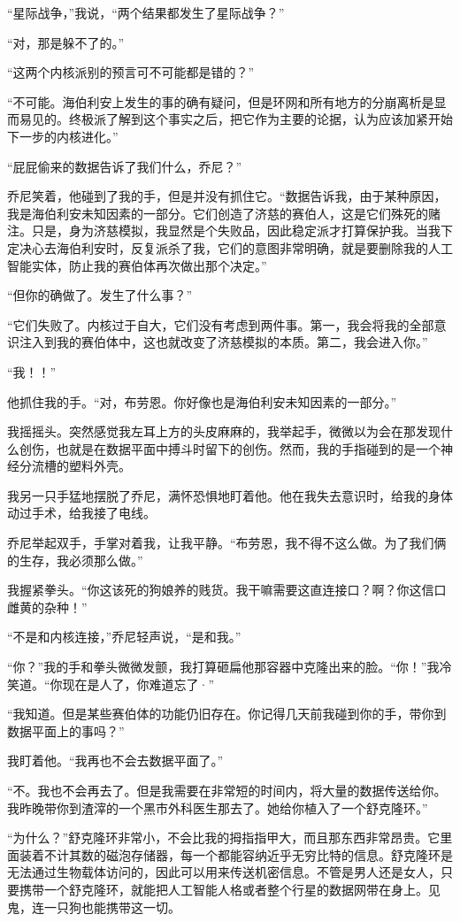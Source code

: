 \documentclass[AutoFakeBold=true]{book}
\begin{document}
``星际战争，''我说，``两个结果都发生了星际战争？''

``对，那是躲不了的。''

``这两个内核派别的预言可不可能都是错的？''

``不可能。海伯利安上发生的事的确有疑问，但是环网和所有地方的分崩离析是显而易见的。终极派了解到这个事实之后，把它作为主要的论据，认为应该加紧开始下一步的内核进化。''

``屁屁偷来的数据告诉了我们什么，乔尼？''

乔尼笑着，他碰到了我的手，但是并没有抓住它。``数据告诉我，由于某种原因，我是海伯利安未知因素的一部分。它们创造了济慈的赛伯人，这是它们殊死的赌注。只是，身为济慈模拟，我显然是个失败品，因此稳定派才打算保护我。当我下定决心去海伯利安时，反复派杀了我，它们的意图非常明确，就是要删除我的人工智能实体，防止我的赛伯体再次做出那个决定。''

``但你的确做了。发生了什么事？''

``它们失败了。内核过于自大，它们没有考虑到两件事。第一，我会将我的全部意识注入到我的赛伯体中，这也就改变了济慈模拟的本质。第二，我会进入你。''

``我！！''

他抓住我的手。``对，布劳恩。你好像也是海伯利安未知因素的一部分。''

我摇摇头。突然感觉我左耳上方的头皮麻麻的，我举起手，微微以为会在那发现什么创伤，也就是在数据平面中搏斗时留下的创伤。然而，我的手指碰到的是一个神经分流槽的塑料外壳。

我另一只手猛地摆脱了乔尼，满怀恐惧地盯着他。他在我失去意识时，给我的身体动过手术，给我接了电线。

乔尼举起双手，手掌对着我，让我平静。``布劳恩，我不得不这么做。为了我们俩的生存，我必须那么做。''

我握紧拳头。``你这该死的狗娘养的贱货。我干嘛需要这直连接口？啊？你这信口雌黄的杂种！''

``不是和内核连接，''乔尼轻声说，``是和我。''

``你？''我的手和拳头微微发颤，我打算砸扁他那容器中克隆出来的脸。``你！''我冷笑道。``你现在是人了，你难道忘了·''

``我知道。但是某些赛伯体的功能仍旧存在。你记得几天前我碰到你的手，带你到数据平面上的事吗？''

我盯着他。``我再也不会去数据平面了。''

``不。我也不会再去了。但是我需要在非常短的时间内，将大量的数据传送给你。我昨晚带你到渣滓的一个黑市外科医生那去了。她给你植入了一个舒克隆环。''

``为什么？''舒克隆环非常小，不会比我的拇指指甲大，而且那东西非常昂贵。它里面装着不计其数的磁泡存储器，每一个都能容纳近乎无穷比特的信息。舒克隆环是无法通过生物载体访问的，因此可以用来传送机密信息。不管是男人还是女人，只要携带一个舒克隆环，就能把人工智能人格或者整个行星的数据网带在身上。见鬼，连一只狗也能携带这一切。
\end{document}
